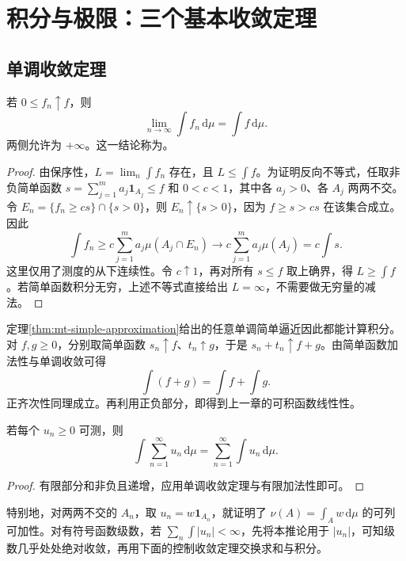 \documentclass[UTF8,12pt,a4paper,fontset=fandol]{ctexbook}
\begin{document}
\chapter{积分与极限：三个基本收敛定理}
\label{chap:mt-convergence}

\section{单调收敛定理}
\begin{theorem}[单调收敛定理]
若 $0\leq f_n\uparrow f$，则
\begin{equation}
 \lim_{n\to\infty}\int f_n\,\mathrm d\mu=\int f\,\mathrm d\mu.
 \label{eq:mt-mct}
\end{equation}
两侧允许为 $+\infty$。这一结论称为。
\label{thm:mt-mct}
\end{theorem}
\begin{proof}
由保序性，$L=\lim_n\int f_n$ 存在，且 $L\leq\int f$。为证明反向不等式，任取非负简单函数 $s=\sum_{j=1}^{m}a_j\mathbf1_{A_j}\leq f$ 和 $0<c<1$，其中各 $a_j>0$、各 $A_j$ 两两不交。令 $E_n=\{f_n\geq cs\}\cap\{s>0\}$，则 $E_n\uparrow\{s>0\}$，因为 $f\geq s>cs$ 在该集合成立。因此
\[
 \int f_n\geq c\sum_{j=1}^{m}a_j\mu(A_j\cap E_n)
 \longrightarrow c\sum_{j=1}^{m}a_j\mu(A_j)=c\int s.
\]
这里仅用了测度的从下连续性。令 $c\uparrow1$，再对所有 $s\leq f$ 取上确界，得 $L\geq\int f$。若简单函数积分无穷，上述不等式直接给出 $L=\infty$，不需要做无穷量的减法。
\end{proof}

定理\ref{thm:mt-simple-approximation}给出的任意单调简单逼近因此都能计算积分。对 $f,g\geq0$，分别取简单函数 $s_n\uparrow f$、$t_n\uparrow g$，于是 $s_n+t_n\uparrow f+g$。由简单函数加法性与单调收敛可得
\[
 \int(f+g)=\int f+\int g.
\]
正齐次性同理成立。再利用正负部分，即得到上一章的可积函数线性性。

\begin{corollary}[非负级数与积分交换]
若每个 $u_n\geq0$ 可测，则
\begin{equation}
 \int\sum_{n=1}^{\infty}u_n\,\mathrm d\mu
 =\sum_{n=1}^{\infty}\int u_n\,\mathrm d\mu.
 \label{eq:mt-series}
\end{equation}
\end{corollary}
\begin{proof}
有限部分和非负且递增，应用单调收敛定理与有限加法性即可。
\end{proof}
特别地，对两两不交的 $A_n$，取 $u_n=w\mathbf1_{A_n}$，就证明了 $\nu(A)=\int_Aw\,\mathrm d\mu$ 的可列可加性。对有符号函数级数，若 $\sum_n\int|u_n|<\infty$，先将本推论用于 $|u_n|$，可知级数几乎处处绝对收敛，再用下面的控制收敛定理交换求和与积分。
\end{document}
